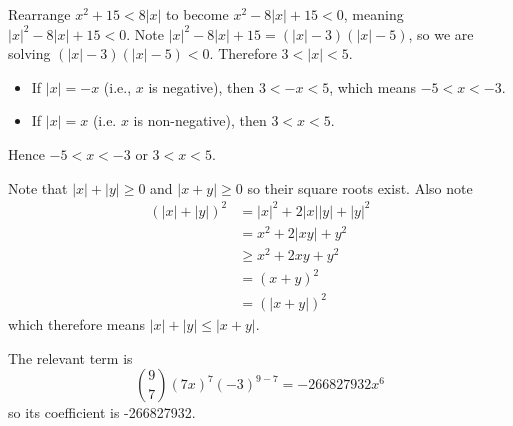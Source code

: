 \begin{questions}
    \item Rearrange $x^2 + 15 < 8|x|$ to become $x^2 - 8|x| + 15 < 0$, meaning $|x|^2 - 8|x| + 15 < 0$. Note $|x|^2 - 8|x| + 15 = (|x|-3)(|x|-5)$, so we are solving $(|x|-3)(|x|-5)<0$. Therefore $3 < |x| < 5$.
    \begin{itemize}
        \item If $|x| = -x$ (i.e., $x$ is negative), then $3 < -x < 5$, which means $-5 < x < -3$.
        \item If $|x| = x$ (i.e. $x$ is non-negative), then $3 < x < 5$.
    \end{itemize}
    Hence $-5 < x < -3$ or $3 < x < 5$.

    \item Note that $|x| + |y| \geq 0$ and $|x + y| \geq 0$ so their square roots exist. Also note
    \begin{align*}
        \left(|x| + |y|\right)^2 &= |x|^2 + 2|x||y| + |y|^2\\
        &= x^2 + 2|xy| + y^2\\
        &\geq x^2 + 2xy + y^2\\
        &= (x+y)^2\\
        &= \left(|x+y|\right)^2
    \end{align*}
    which therefore means $|x| + |y| \leq |x+y|$.

    \item The relevant term is
    \[
        {9 \choose 7}(7x)^7(-3)^{9-7} = -266827932x^6
    \]
    so its coefficient is -266827932.
\end{questions}

